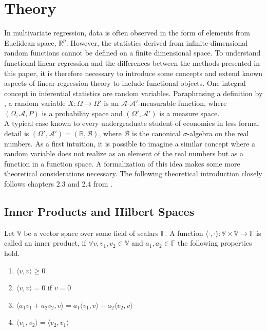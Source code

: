 \documentclass[11pt,twoside,a4paper]{article}
\begin{document}
	\section{Theory}
	In multivariate regression, data is often observed in the form of elements from Euclidean space, $\mathbb{R}^p$. However, the statistics derived from infinite-dimensional random functions cannot be defined on a finite dimensional space. To understand functional linear regression and the differences between the methods presented in this paper, it is therefore necessary to introduce some concepts and extend known aspects of linear regression theory to include functional objects. One integral concept in inferential statistics are random variables. Paraphrasing a definition by \cite{bauer_wahrscheinlichkeitstheorie_2020}, a random variable $X:\Omega \rightarrow \Omega'$ is an $\mathcal{A} \text{-} \mathcal{A'} \text{-measurable}$ function, where $(\Omega, \mathcal{A}, P)$ is a probability space and $(\Omega', \mathcal{A'})$ is a measure space.\\
	A typical case known to every undergraduate student of economics in less formal detail is $(\Omega', \mathcal{A'}) = (\mathbb{R}, \mathcal{B})$, where $\mathcal{B}$ is the canonical $\sigma$-algebra on the real numbers. As a first intuition, it is possible to imagine a similar concept where a random variable does not realize as an element of the real numbers but as a function in a function space. A formalization of this idea makes some more theoretical considerations necessary. The following theoretical introduction closely follows chapters 2.3 and 2.4 from \cite{hsing_theoretical_2015}. 
	
	\subsection{Inner Products and Hilbert Spaces}
	Let $\mathbb{V}$ be a vector space over some field of scalars $\mathbb{F}$. A function $\langle \cdot, \cdot \rangle : \mathbb{V} \times  \mathbb{V} \rightarrow \mathbb{F}$ is called an inner product, if $\forall v, v_1, v_2 \in \mathbb{V}$ and $a_1, a_2 \in \mathbb{F}$ the following properties hold.
	
	\begin{multicols}{2}
		\begin{enumerate}
			\item $\langle v, v \rangle \geq 0$
			\item $\langle v, v \rangle = 0$ if $v = 0$
			\item $\langle a_1 v_1 + a_2 v_2, v \rangle = a_1 \langle v_1, v \rangle + a_2 \langle v_2, v \rangle$
			\item $\langle v_1, v_2 \rangle = \langle v_2, v_1 \rangle$
		\end{enumerate}
	\end{multicols}
\end{document}
